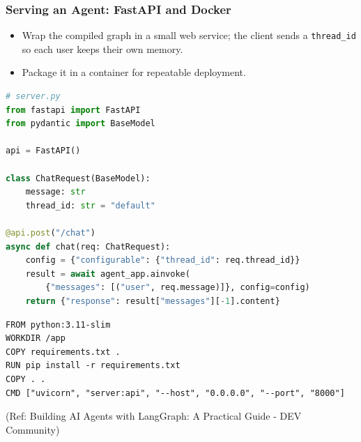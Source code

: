 \begin{frame}[fragile]\frametitle{Serving an Agent: FastAPI and Docker}
      \begin{itemize}
        \item Wrap the compiled graph in a small web service; the client sends a \texttt{thread\_id} so each user keeps their own memory.
        \item Package it in a container for repeatable deployment.
      \end{itemize}
\begin{lstlisting}[language=Python, basicstyle=\scriptsize\ttfamily]
# server.py
from fastapi import FastAPI
from pydantic import BaseModel

api = FastAPI()

class ChatRequest(BaseModel):
    message: str
    thread_id: str = "default"

@api.post("/chat")
async def chat(req: ChatRequest):
    config = {"configurable": {"thread_id": req.thread_id}}
    result = await agent_app.ainvoke(
        {"messages": [("user", req.message)]}, config=config)
    return {"response": result["messages"][-1].content}
\end{lstlisting}
\begin{lstlisting}[basicstyle=\scriptsize\ttfamily]
FROM python:3.11-slim
WORKDIR /app
COPY requirements.txt .
RUN pip install -r requirements.txt
COPY . .
CMD ["uvicorn", "server:api", "--host", "0.0.0.0", "--port", "8000"]
\end{lstlisting}

{\tiny (Ref: Building AI Agents with LangGraph: A Practical Guide - DEV Community)}
\end{frame}
